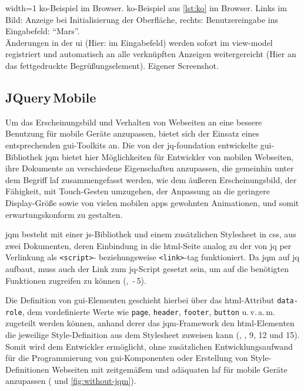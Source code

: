 	{width=1\textwidth}
	{\gls{ko}-Beispiel im Browser.}
		{\gls{ko}-Beispiel aus \autoref{lst:ko} im Browser. Links im Bild: Anzeige bei Initialisierung der Oberfläche, rechts: Benutzereingabe ins Eingabefeld: \enquote{Mars}. \\ Änderungen in der \gls{ui} (Hier: im Eingabefeld) werden sofort im \gls{view-model} registriert und automatisch an alle verknüpften Anzeigen weitergereicht (Hier an das fettgedruckte Begrüßungselement).}
	{Eigener Screenshot.}


\subsection{JQuery\,Mobile}

Um das Erscheinungsbild und Verhalten von Webseiten an eine bessere Benutzung für mobile Geräte anzupassen, bietet sich der Einsatz eines entsprechenden \gls{gui}-Toolkits an. 
Die von der \gls{jq-foundation} entwickelte \gls{gui}-Bibliothek \gls{jqm} bietet hier Möglichkeiten für Entwickler von mobilen Webseiten, ihre Dokumente an verschiedene Eigenschaften anzupassen, die gemeinhin unter dem Begriff \gls{laf} zusammengefasst werden, wie dem äußeren Erscheinungsbild, der Fähigkeit, mit Touch-Gesten umzugehen, der Anpassung an die geringere Display-Größe sowie von vielen mobilen \glspl{app} gewohnten Animationen, und somit erwartungskonform zu gestalten.

\Gls{jqm} besteht mit einer \gls{js}-Bibliothek und einem zusätzlichen Stylesheet in \gls{css}, aus zwei Dokumenten, deren Einbindung in die \gls{html}-Seite analog zu der von \gls{jq} per Verlinkung als \lstinline|<script>|- beziehungsweise \lstinline|<link>|-\gls{tag} funktioniert.
Da \gls{jqm} auf \gls{jq} aufbaut, muss auch der Link zum \gls{jq}-Script gesetzt sein, um auf die benötigten Funktionen zugreifen zu können (, \,-\,5).

	
Die Definition von \gls{gui}-Elementen geschieht hierbei über das \gls{html}-Attribut \lstinline|data-role|, dem vordefinierte Werte wie \lstinline|page|, \lstinline|header|, \lstinline|footer|, \lstinline|button| u.\,v.\,a.\,m. zugeteilt werden können, anhand derer das \gls{jqm}-Framework den \gls{html}-Elementen die jeweilige Style-Definition aus dem Stylesheet zuweisen kann (, , 9, 12 und 15).
Somit wird dem Entwickler ermöglicht, ohne zusätzlichen Entwicklungsaufwand für die Programmierung von \gls{gui}-Komponenten oder Erstellung von Style-Definitionen Webseiten mit zeitgemäßem und adäquaten \gls{laf} für mobile Geräte anzupassen ( und \ref{fig:without-jqm}).

